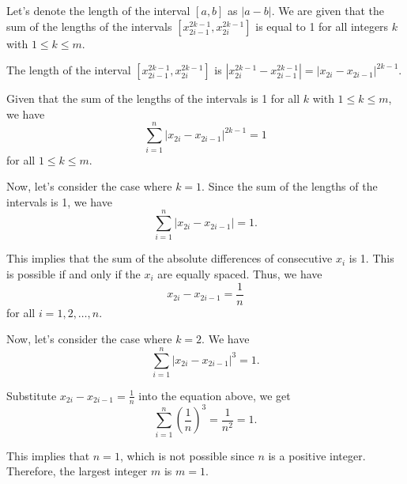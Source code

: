 Let's denote the length of the interval \([a,b]\) as \(|a-b|\). We are given that the sum of the lengths of the intervals \([x_{2i-1}^{2k-1}, x_{2i}^{2k-1}]\) is equal to 1 for all integers \(k\) with \(1 \leq k \leq m\).

The length of the interval \([x_{2i-1}^{2k-1}, x_{2i}^{2k-1}]\) is \(|x_{2i}^{2k-1} - x_{2i-1}^{2k-1}| = |x_{2i} - x_{2i-1}|^{2k-1}\).

Given that the sum of the lengths of the intervals is 1 for all \(k\) with \(1 \leq k \leq m\), we have
\[
\sum_{i=1}^{n} |x_{2i} - x_{2i-1}|^{2k-1} = 1
\]
for all \(1 \leq k \leq m\).

Now, let's consider the case where \(k = 1\). Since the sum of the lengths of the intervals is 1, we have
\[
\sum_{i=1}^{n} |x_{2i} - x_{2i-1}| = 1.
\]

This implies that the sum of the absolute differences of consecutive \(x_i\) is 1. This is possible if and only if the \(x_i\) are equally spaced. Thus, we have
\[
x_{2i} - x_{2i-1} = \frac{1}{n}
\]
for all \(i = 1, 2, \ldots, n\).

Now, let's consider the case where \(k = 2\). We have
\[
\sum_{i=1}^{n} |x_{2i} - x_{2i-1}|^3 = 1.
\]

Substitute \(x_{2i} - x_{2i-1} = \frac{1}{n}\) into the equation above, we get
\[
\sum_{i=1}^{n} \left(\frac{1}{n}\right)^3 = \frac{1}{n^2} = 1.
\]

This implies that \(n = 1\), which is not possible since \(n\) is a positive integer. Therefore, the largest integer \(m\) is \(m = 1\).
